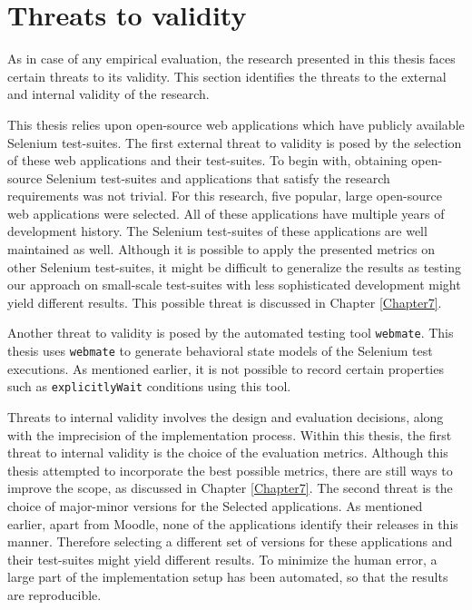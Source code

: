 \chapter{Threats to validity} %

\label{Chapter6} %


As in case of any empirical evaluation, the research presented in this thesis faces certain threats to its validity. This section identifies the threats to the external and internal validity of the research.

This thesis relies upon open-source web applications which have publicly available Selenium test-suites. The first external threat to validity is posed by the selection of these web applications and their test-suites. To begin with, obtaining open-source Selenium test-suites and applications that satisfy the research requirements was not trivial. For this research, five popular, large open-source web applications were selected. All of these applications have multiple years of development history. The Selenium test-suites of these applications are well maintained as well. Although it is possible to apply the presented metrics on other Selenium test-suites, it might be difficult to generalize the results as testing our approach on small-scale test-suites with less sophisticated development might yield different results. This possible threat is discussed in Chapter \ref{Chapter7}.

Another threat to validity is posed by the automated testing tool \texttt{webmate}. This thesis uses \texttt{webmate} to generate behavioral state models of the Selenium test executions. As mentioned earlier, it is not possible to record certain properties such as \texttt{explicitlyWait} conditions using this tool. 

Threats to internal validity involves the design and evaluation decisions, along with the imprecision of the implementation process. Within this thesis, the first threat to internal validity is the choice of the evaluation metrics. Although this thesis attempted to incorporate the best possible metrics, there are still ways to improve the scope, as discussed in Chapter \ref{Chapter7}. The second threat is the choice of major-minor versions for the Selected applications. As mentioned earlier, apart from Moodle, none of the applications identify their releases in this manner. Therefore selecting a different set of versions for these applications and their test-suites might yield different results. To minimize the human error, a large part of the implementation setup has been automated, so that the results are reproducible.
